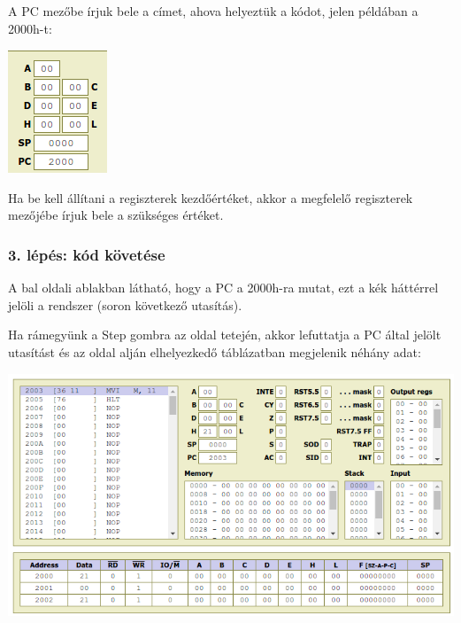 \documentclass{article}
\begin{document}
A PC mezőbe írjuk bele a címet, ahova helyeztük a kódot, jelen példában a 2000h-t:

\includegraphics[scale=0.5]{sim_lepes5.png}

Ha be kell állítani a regiszterek kezdőértéket, akkor a megfelelő regiszterek mezőjébe írjuk bele a szükséges értéket.

\subsubsection{3. lépés: kód követése}

A bal oldali ablakban látható, hogy a PC a 2000h-ra mutat, ezt a kék háttérrel jelöli a rendszer (soron következő utasítás).

Ha rámegyünk a Step gombra az oldal tetején, akkor lefuttatja a PC által jelölt utasítást és az oldal alján elhelyezkedő táblázatban megjelenik néhány adat:

\includegraphics[scale=0.5]{sim_lepes6.png}
\end{document}
